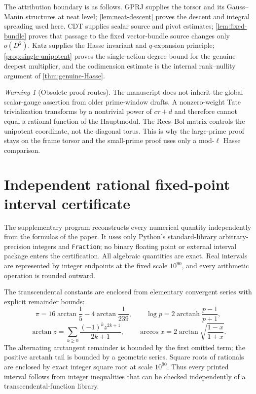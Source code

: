 \documentclass[11pt]{article}
\theoremstyle{definition}
\theoremstyle{remark}
\newtheorem{warning}[warning]{Warning}
\begin{document}
The attribution boundary is as follows.  GPRJ supplies the torsor and its
Gauss--Manin structures at neat level; \cref{lem:neat-descent} proves the
descent and integral spreading used here.  CDT supplies scalar source and
pivot estimates; \cref{lem:fixed-bundle} proves that passage to the fixed
vector-bundle source changes only $o(D^2)$.  Katz supplies the Hasse invariant
and $q$-expansion principle; \cref{prop:single-unipotent} proves the
single-action degree bound for the genuine deepest multiplier, and the
codimension estimate is the internal rank--nullity argument of
\cref{thm:genuine-Hasse}.

\begin{warning}[Obsolete proof routes]
The manuscript does not inherit the global scalar-gauge assertion from older
prime-window drafts.  A nonzero-weight Tate trivialization transforms by a
nontrivial power of $c\tau+d$ and therefore cannot equal a rational function
of the Hauptmodul.  The Rees--Bol matrix controls the unipotent coordinate,
not the diagonal torus.  This is why the large-prime proof stays on the frame
torsor and the small-prime proof uses only a mod-$\ell$ Hasse comparison.
\end{warning}

\appendix

\section{Independent rational fixed-point interval certificate}
\label{app:certificate}

The supplementary program
 reconstructs every numerical
quantity independently from the formulas of the paper.  It uses only Python's
standard-library arbitrary-precision integers and \texttt{Fraction}; no binary
floating point or external interval package enters the certification.
All algebraic quantities are exact.  Real intervals are represented by integer
endpoints at the fixed scale $10^{90}$, and every arithmetic operation is
rounded outward.

The transcendental constants are enclosed from elementary convergent series
with explicit remainder bounds:
\[
 \pi=16\arctan\frac15-4\arctan\frac1{239},
 \qquad
 \log p=2\operatorname{arctanh}\frac{p-1}{p+1},
\]
\[
 \arctan z=\sum_{k\ge0}\frac{(-1)^kz^{2k+1}}{2k+1},
 \qquad
 \arccos x=2\arctan\sqrt{\frac{1-x}{1+x}}.
\]
The alternating arctangent remainder is bounded by the first omitted term;
the positive arctanh tail is bounded by a geometric series.  Square roots of
rationals are enclosed by exact integer square root at scale $10^{90}$.
Thus every printed interval follows from integer inequalities that can be
checked independently of a transcendental-function library.
\end{document}
